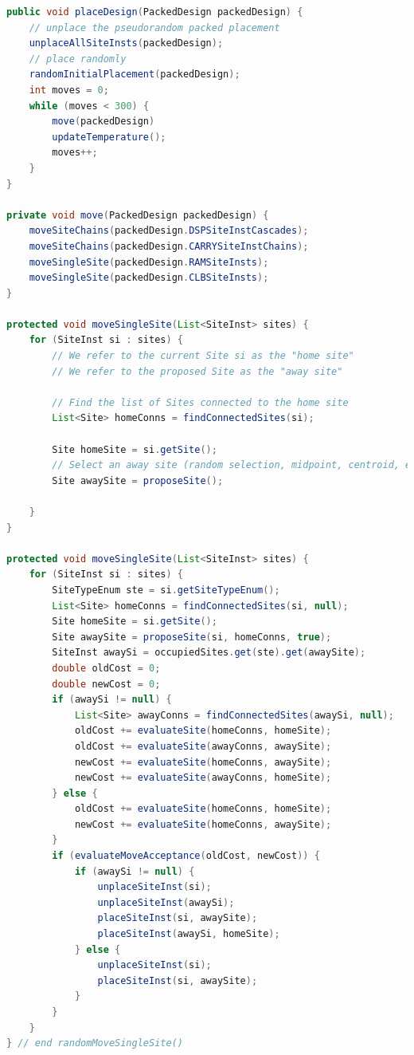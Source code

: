 \begin{lstlisting}[language=java, caption={Simulated Annealing pseudocode}, label={lst:sa_pseudocode}]
public void placeDesign(PackedDesign packedDesign) {
    // unplace the pseudorandom packed placement
    unplaceAllSiteInsts(packedDesign);
    // place randomly
    randomInitialPlacement(packedDesign);
    int moves = 0;
    while (moves < 300) {
        move(packedDesign)
        updateTemperature();
        moves++;
    }
}

private void move(PackedDesign packedDesign) {
    moveSiteChains(packedDesign.DSPSiteInstCascades);
    moveSiteChains(packedDesign.CARRYSiteInstChains);
    moveSingleSite(packedDesign.RAMSiteInsts);
    moveSingleSite(packedDesign.CLBSiteInsts);
}

protected void moveSingleSite(List<SiteInst> sites) {
    for (SiteInst si : sites) {
        // We refer to the current Site si as the "home site"
        // We refer to the proposed Site as the "away site"

        // Find the list of Sites connected to the home site
        List<Site> homeConns = findConnectedSites(si);

        Site homeSite = si.getSite();
        // Select an away site (random selection, midpoint, centroid, etc.)
        Site awaySite = proposeSite();

    }
}

protected void moveSingleSite(List<SiteInst> sites) {
    for (SiteInst si : sites) {
        SiteTypeEnum ste = si.getSiteTypeEnum();
        List<Site> homeConns = findConnectedSites(si, null);
        Site homeSite = si.getSite();
        Site awaySite = proposeSite(si, homeConns, true);
        SiteInst awaySi = occupiedSites.get(ste).get(awaySite);
        double oldCost = 0;
        double newCost = 0;
        if (awaySi != null) {
            List<Site> awayConns = findConnectedSites(awaySi, null);
            oldCost += evaluateSite(homeConns, homeSite);
            oldCost += evaluateSite(awayConns, awaySite);
            newCost += evaluateSite(homeConns, awaySite);
            newCost += evaluateSite(awayConns, homeSite);
        } else {
            oldCost += evaluateSite(homeConns, homeSite);
            newCost += evaluateSite(homeConns, awaySite);
        }
        if (evaluateMoveAcceptance(oldCost, newCost)) {
            if (awaySi != null) {
                unplaceSiteInst(si);
                unplaceSiteInst(awaySi);
                placeSiteInst(si, awaySite);
                placeSiteInst(awaySi, homeSite);
            } else {
                unplaceSiteInst(si);
                placeSiteInst(si, awaySite);
            }
        }
    }
} // end randomMoveSingleSite()
\end{lstlisting}

